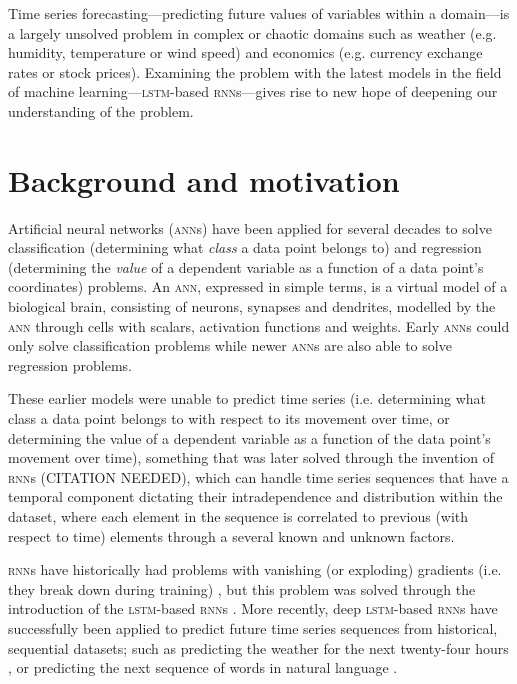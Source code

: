 Time series forecasting---predicting future values of variables within a domain---is a largely unsolved problem in complex or chaotic domains such as weather (e.g. humidity, temperature or wind speed) and economics (e.g. currency exchange rates or stock prices). Examining the problem with the latest models in the field of machine learning---\textsc{lstm}-based \textsc{rnn}s---gives rise to new hope of deepening our understanding of the problem.

\section{Background and motivation}
Artificial neural networks (\textsc{ann}s) have been applied for several decades to solve classification (determining what \textit{class} a data point belongs to) and regression (determining the \textit{value} of a dependent variable as a function of a data point's coordinates) problems. An \textsc{ann}, expressed in simple terms, is a virtual model of a biological brain, consisting of neurons, synapses and dendrites, modelled by the \textsc{ann} through cells with scalars, activation functions and weights. Early \textsc{ann}s could only solve classification problems \citep{rosenblatt1958} while newer \textsc{ann}s are also able to solve regression problems.

These earlier models were unable to predict time series (i.e. determining what class a data point belongs to with respect to its movement over time, or determining the value of a dependent variable as a function of the data point's movement over time), something that was later solved through the invention of \textsc{rnn}s (CITATION NEEDED), which can handle time series sequences that have a temporal component dictating their intradependence and distribution within the dataset, where each element in the sequence is correlated to previous (with respect to time) elements through a several known and unknown factors.

\textsc{rnn}s have historically had problems with vanishing (or exploding) gradients (i.e. they break down during training) \citep{pascanu2012}, but this problem was solved through the introduction of the \textsc{lstm}-based \textsc{rnn}s \citep*{hochreiter1997}. More recently, deep \textsc{lstm}-based \textsc{rnn}s have successfully been applied to predict future time series sequences from historical, sequential datasets; such as predicting the weather for the next twenty-four hours \citep*{zaytar2016}, or predicting the next sequence of words in natural language \citep*{quoc2014}.

